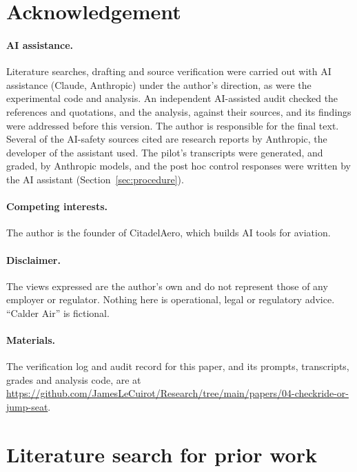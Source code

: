 \documentclass[11pt]{article}
\begin{document}
\section*{Acknowledgement}
\paragraph{AI assistance.} Literature searches, drafting and source verification were carried out with AI assistance (Claude, Anthropic) under the author's direction, as were the experimental code and analysis. An independent AI-assisted audit checked the references and quotations, and the analysis, against their sources, and its findings were addressed before this version. The author is responsible for the final text. Several of the AI-safety sources cited are research reports by Anthropic, the developer of the assistant used. The pilot's transcripts were generated, and graded, by Anthropic models, and the post hoc control responses were written by the AI assistant (Section~\ref{sec:procedure}).
\paragraph{Competing interests.} The author is the founder of CitadelAero, which builds AI tools for aviation.
\paragraph{Disclaimer.} The views expressed are the author's own and do not represent those of any employer or regulator. Nothing here is operational, legal or regulatory advice. ``Calder Air'' is fictional.
\paragraph{Materials.} The verification log and audit record for this paper, and its prompts, transcripts, grades and analysis code, are at \url{https://github.com/JamesLeCuirot/Research/tree/main/papers/04-checkride-or-jump-seat}.




\appendix
\section{Literature search for prior work}\label{app:search}
\end{document}
